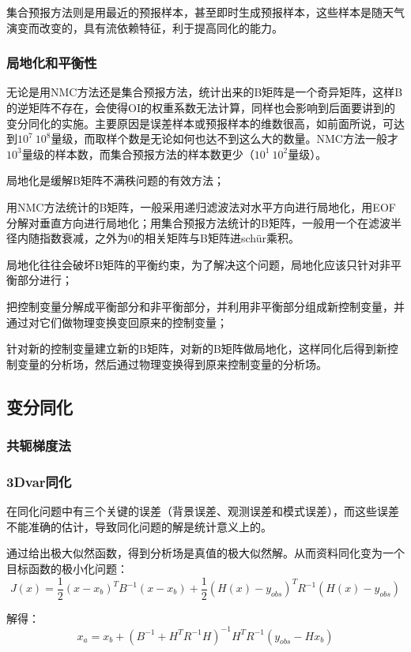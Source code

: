 \documentclass{article}
\begin{document}
集合预报方法则是用最近的预报样本，甚至即时生成预报样本，这些样本是随天气演变而改变的，具有流依赖特征，利于提高同化的能力。

\subsubsection{局地化和平衡性}
无论是用NMC方法还是集合预报方法，统计出来的B矩阵是一个奇异矩阵，这样B的逆矩阵不存在，会使得OI的权重系数无法计算，同样也会影响到后面要讲到的变分同化的实施。主要原因是误差样本或预报样本的维数很高，如前面所说，可达到$10^7~10^8$量级，而取样个数是无论如何也达不到这么大的数量。NMC方法一般才$10^3$量级的样本数，而集合预报方法的样本数更少（$10^1~10^2$量级）。

局地化是缓解B矩阵不满秩问题的有效方法；

用NMC方法统计的B矩阵，一般采用递归滤波法对水平方向进行局地化，用EOF分解对垂直方向进行局地化；用集合预报方法统计的B矩阵，一般用一个在滤波半径内随指数衰减，之外为0的相关矩阵与B矩阵进schür乘积。

局地化往往会破坏B矩阵的平衡约束，为了解决这个问题，局地化应该只针对非平衡部分进行；

把控制变量分解成平衡部分和非平衡部分，并利用非平衡部分组成新控制变量，并通过对它们做物理变换变回原来的控制变量；

针对新的控制变量建立新的B矩阵，对新的B矩阵做局地化，这样同化后得到新控制变量的分析场，然后通过物理变换得到原来控制变量的分析场。

\subsection{变分同化}
\subsubsection{共轭梯度法}
\subsubsection{3Dvar同化}

在同化问题中有三个关键的误差（背景误差、观测误差和模式误差），而这些误差不能准确的估计，导致同化问题的解是统计意义上的。

通过给出极大似然函数，得到分析场是真值的极大似然解。从而资料同化变为一个目标函数的极小化问题：
$$J(x) = \frac{1}{2}(x-x_b)^{T}B^{-1}(x-x_b) + \frac{1}{2}(H(x)-y_{obs})^{T}R^{-1}(H(x)-y_{obs})$$

解得：
$$x_a = x_b + (B^{-1} + H^TR^{-1}H)^{-1}H^TR^{-1}(y_{obs} - Hx_b)$$
\end{document}
